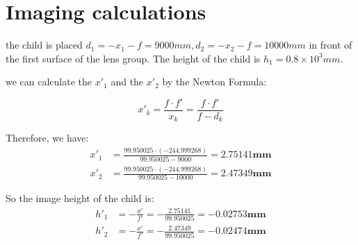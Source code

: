 \documentclass{article}
\begin{document}
\section{Imaging calculations}
the child is placed $d_1= -x_1-f= 9000mm, d_2=-x_2-f = 10000mm$ in front of the first surface of the lens group. The height of the child is $h_1 = 0.8\times 10^3mm$.

we can calculate the $x'_1$ and the $x'_2$ by the Newton Formula:

\begin{equation}
    x'_k = \frac{f\cdot f'}{x_k} = \frac{f\cdot f'}{f-d_k}
\end{equation}

Therefore, we have:
\begin{align*}
    x'_1 & = \frac{99.950025\cdot (-244.999268)}{99.950025-9000} = 2.75141\mathbf{mm} \\
    x'_2 & = \frac{99.950025\cdot(-244.999268)}{99.950025-10000} = 2.47349\mathbf{mm}
\end{align*}

So the image height of the child is:
\begin{align*}
    h'_1 & =  - \frac{x'}{f'}= -\frac{2.75141}{99.950025} = -0.02753\mathbf{mm} \\
    h'_2 & =  - \frac{x'}{f'}= -\frac{2.47349}{99.950025} = -0.02474\mathbf{mm}
\end{align*}
\end{document}
